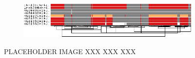 \begin{figure}[ht!]
    \begin{subfigure}{\linewidth}
        \centering
        \includegraphics[width=1.0\linewidth, trim=-0cm 2cm 0 0cm]{fig/wflambda/chr6_pan_fa_a2fb268_4030258_6a1ecc2_smooth_C4_bad_sorted}
        \label{fig:bad-sorting}
    \end{subfigure}
    \caption{
        PLACEHOLDER IMAGE XXX XXX XXX
    }
    \label{fig:wflambda}
\end{figure}
